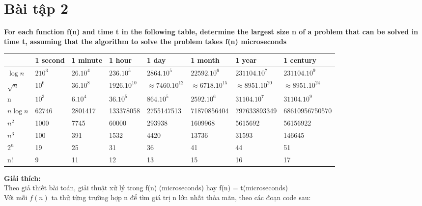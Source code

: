 \documentclass[10pt,a4paper]{article}
\begin{document}
\section*{Bài tập 2} 
\textbf{For each function f(n) and time t in the following table, determine the largest size n of a problem that can be solved in time t, assuming that the algorithm to solve the problem takes f(n) microseconds}\\
\begin{table}[H]
    \centering
    \begin{tabular}[c]{|p{0.85cm}|p{2cm}|p{2cm}|p{2cm}|p{2cm}|p{2cm}|p{2cm}|p{2.3cm}|}\hline
     \rowcolor[rgb]{0, .60, .800}& 1 second&1 minute&1 hour&1 day&1 month&1 year&1 century \tabularnewline\hline
    $\log{n}$  & $2{10^{3}}$ & $2{6.10^{4}}$ & $2{36.10^{5}}$ & $2{864.10^{5}}$ & $2{2592.10^{6}}$ & $2{31104.10^{7}}$ & $2{31104.10^{9}}$ \tabularnewline\hline
    $\sqrt{n}$ & $10^6$ & $36.10^8$ & $1926.10^{10}$ & $\approx 7460.10^{12}$ & $\approx 6718.10^{15}$ & $\approx 8951.10^{20}$ & $\approx 8951.10^{24}$ \tabularnewline\hline
    n & $10^{3}$ & $6.10^{4}$ & $36.10^{5}$ & $864.10^{5}$ & $2592.10^{6}$ & $31104.10^{7}$ & $31104.10^{9}$ \tabularnewline\hline
    $n\log{n}$ & 62746 & 2801417 & 133378058 & 2755147513 & 71870856404 & 797633893349 & 68610956750570 \tabularnewline\hline
    $n^2$  & 1000 & 7745 & 60000 & 293938 & 1609968 & 5615692 & 56156922 \tabularnewline\hline
    $n^3$ & 100 & 391 & 1532 & 4420 & 13736 & 31593 & 146645 \tabularnewline\hline
    $2^n$ & 19 & 25 & 31 & 36 & 41 & 44 & 51 \tabularnewline\hline
    n! & 9 & 11 & 12 & 13 & 15 & 16 & 17 \tabularnewline\hline
    \end{tabular}
\end{table}
\textbf{Giải thích:}\\
Theo giả thiết bài toán, giải thuật xử lý trong f(n) (microseconds) hay f(n) = t(microseconds)\\
Với mỗi $f(n)$ ta thử từng trường hợp n để tìm giá trị n lớn nhất thỏa mãn, theo các đoạn code sau:
\end{document}
